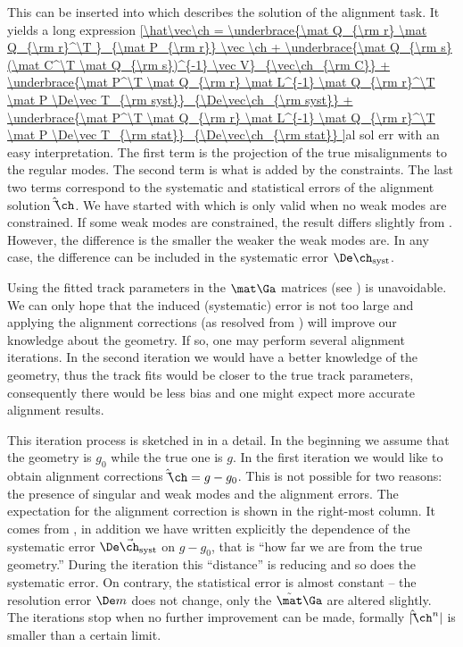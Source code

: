 This can be inserted into  which describes the solution of the alignment task. It yields a long expression
\eqref{\hat\vec\ch =
	\underbrace{\mat Q_{\rm r} \mat Q_{\rm r}^\T }_{\mat P_{\rm r}} \vec \ch
	+ \underbrace{\mat Q_{\rm s} (\mat C^\T \mat Q_{\rm s})^{-1} \vec V}_{\vec\ch_{\rm C}}
	+ \underbrace{\mat P^\T \mat Q_{\rm r} \mat L^{-1} \mat Q_{\rm r}^\T \mat P \De\vec T_{\rm syst}}_{\De\vec\ch_{\rm syst}}
	+ \underbrace{\mat P^\T \mat Q_{\rm r} \mat L^{-1} \mat Q_{\rm r}^\T \mat P \De\vec T_{\rm stat}}_{\De\vec\ch_{\rm stat}}
}{al sol err}
with an easy interpretation. The first term is the projection of the true misalignments to the regular modes. The second term is what is added by the constraints. The last two terms correspond to the systematic and statistical errors of the alignment solution $\hat\vec\ch$. We have started with  which is only valid when no weak modes are constrained. If some weak modes are constrained, the result differs slightly from . However, the difference is the smaller the weaker the weak modes are. In any case, the difference can be included in the systematic error $\De\ch_{\rm syst}$.

Using the fitted track parameters in the $\mat\Ga$ matrices (see ) is unavoidable. We can only hope that the induced (systematic) error is not too large and applying the alignment corrections (as resolved from ) will improve our knowledge about the geometry. If so, one may perform several alignment iterations. In the second iteration we would have a better knowledge of the geometry, thus the track fits would be closer to the true track parameters, consequently there would be less bias and one might expect more accurate alignment results.

This iteration process is sketched in  in a detail. In the beginning we assume that the geometry is $g_0$ while the true one is $g$. In the first iteration we would like to obtain alignment corrections $\hat\vec\ch = g - g_0$. This is not possible for two reasons: the presence of singular and weak modes and the alignment errors. The expectation for the alignment correction is shown in the right-most column. It comes from , in addition we have written explicitly the dependence of the systematic error $\De\vec\ch_{\rm syst}$ on $g - g_0$, that is ``how far we are from the true geometry.'' During the iteration this ``distance'' is reducing and so does the systematic error. On contrary, the statistical error is almost constant -- the resolution error $\De m$ does not change, only the $\tilde\mat\Ga$ are altered slightly. The iterations stop when no further improvement can be made, formally $|\hat\vec\ch^n|$ is smaller than a certain limit.

